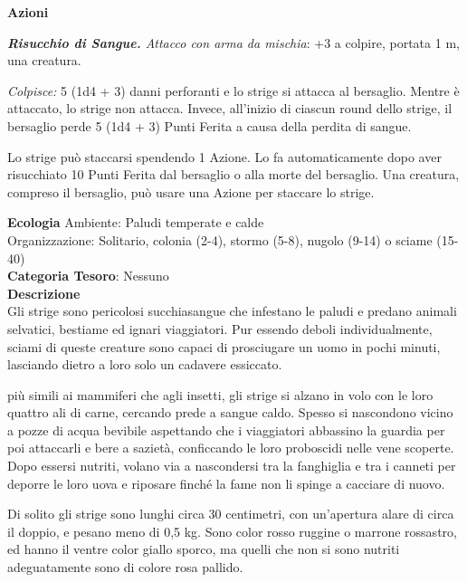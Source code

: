 \begin{multicols}{2}
{\textbf{Azioni}

\emph{\textbf{Risucchio di Sangue.} Attacco con arma da mischia}: +3 a colpire, portata 1 m, una creatura.

\emph{Colpisce:} 5 (1d4 + 3) danni perforanti e lo strige si attacca al bersaglio. Mentre è attaccato, lo strige non attacca. Invece, all'inizio di ciascun round dello strige, il bersaglio perde 5 (1d4 + 3) Punti Ferita a causa della perdita di sangue.

Lo strige può staccarsi spendendo 1 Azione. Lo fa automaticamente dopo aver risucchiato 10 Punti Ferita dal bersaglio o alla morte del bersaglio. Una creatura, compreso il bersaglio, può usare una Azione per staccare lo strige.

\textbf{Ecologia}
Ambiente: Paludi temperate e calde\\
Organizzazione: Solitario, colonia (2-4), stormo (5-8), nugolo (9-14) o sciame (15-40)\\
\textbf{Categoria Tesoro}: Nessuno\\
\textbf{Descrizione}\\
Gli strige sono pericolosi succhiasangue che infestano le paludi e predano animali selvatici, bestiame ed ignari viaggiatori. Pur essendo deboli individualmente, sciami di queste creature sono capaci di prosciugare un uomo in pochi minuti, lasciando dietro a loro solo un cadavere essiccato.

più simili ai mammiferi che agli insetti, gli strige si alzano in volo con le loro quattro ali di carne, cercando prede a sangue caldo. Spesso si nascondono vicino a pozze di acqua bevibile aspettando che i viaggiatori abbassino la guardia per poi attaccarli e bere a sazietà, conficcando le loro proboscidi nelle vene scoperte. Dopo essersi nutriti, volano via a nascondersi tra la fanghiglia e tra i canneti per deporre le loro uova e riposare finché la fame non li spinge a cacciare di nuovo.

Di solito gli strige sono lunghi circa 30 centimetri, con un'apertura alare di circa il doppio, e pesano meno di 0,5 kg. Sono color rosso ruggine o marrone rossastro, ed hanno il ventre color giallo sporco, ma quelli che non si sono nutriti adeguatamente sono di colore rosa pallido.


}
\end{multicols}
